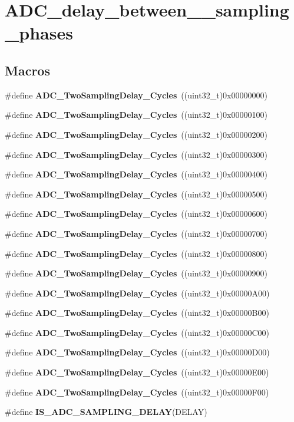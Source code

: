 \section{A\+D\+C\+\_\+delay\+\_\+between\+\_\+\_\+sampling\+\_\+phases}
\label{group__ADC__delay__between__2__sampling__phases}
\subsection*{Macros}
\begin{DoxyCompactItemize}
\item 
\#define \textbf{ A\+D\+C\+\_\+\+Two\+Sampling\+Delay\+\_\+Cycles}~((uint32\+\_\+t)0x00000000)
\item 
\#define \textbf{ A\+D\+C\+\_\+\+Two\+Sampling\+Delay\+\_\+Cycles}~((uint32\+\_\+t)0x00000100)
\item 
\#define \textbf{ A\+D\+C\+\_\+\+Two\+Sampling\+Delay\+\_\+Cycles}~((uint32\+\_\+t)0x00000200)
\item 
\#define \textbf{ A\+D\+C\+\_\+\+Two\+Sampling\+Delay\+\_\+Cycles}~((uint32\+\_\+t)0x00000300)
\item 
\#define \textbf{ A\+D\+C\+\_\+\+Two\+Sampling\+Delay\+\_\+Cycles}~((uint32\+\_\+t)0x00000400)
\item 
\#define \textbf{ A\+D\+C\+\_\+\+Two\+Sampling\+Delay\+\_\+Cycles}~((uint32\+\_\+t)0x00000500)
\item 
\#define \textbf{ A\+D\+C\+\_\+\+Two\+Sampling\+Delay\+\_\+Cycles}~((uint32\+\_\+t)0x00000600)
\item 
\#define \textbf{ A\+D\+C\+\_\+\+Two\+Sampling\+Delay\+\_\+Cycles}~((uint32\+\_\+t)0x00000700)
\item 
\#define \textbf{ A\+D\+C\+\_\+\+Two\+Sampling\+Delay\+\_\+Cycles}~((uint32\+\_\+t)0x00000800)
\item 
\#define \textbf{ A\+D\+C\+\_\+\+Two\+Sampling\+Delay\+\_\+Cycles}~((uint32\+\_\+t)0x00000900)
\item 
\#define \textbf{ A\+D\+C\+\_\+\+Two\+Sampling\+Delay\+\_\+Cycles}~((uint32\+\_\+t)0x00000\+A00)
\item 
\#define \textbf{ A\+D\+C\+\_\+\+Two\+Sampling\+Delay\+\_\+Cycles}~((uint32\+\_\+t)0x00000\+B00)
\item 
\#define \textbf{ A\+D\+C\+\_\+\+Two\+Sampling\+Delay\+\_\+Cycles}~((uint32\+\_\+t)0x00000\+C00)
\item 
\#define \textbf{ A\+D\+C\+\_\+\+Two\+Sampling\+Delay\+\_\+Cycles}~((uint32\+\_\+t)0x00000\+D00)
\item 
\#define \textbf{ A\+D\+C\+\_\+\+Two\+Sampling\+Delay\+\_\+Cycles}~((uint32\+\_\+t)0x00000\+E00)
\item 
\#define \textbf{ A\+D\+C\+\_\+\+Two\+Sampling\+Delay\+\_\+Cycles}~((uint32\+\_\+t)0x00000\+F00)
\item 
\#define \textbf{ I\+S\+\_\+\+A\+D\+C\+\_\+\+S\+A\+M\+P\+L\+I\+N\+G\+\_\+\+D\+E\+L\+AY}(D\+E\+L\+AY)
\end{DoxyCompactItemize}


